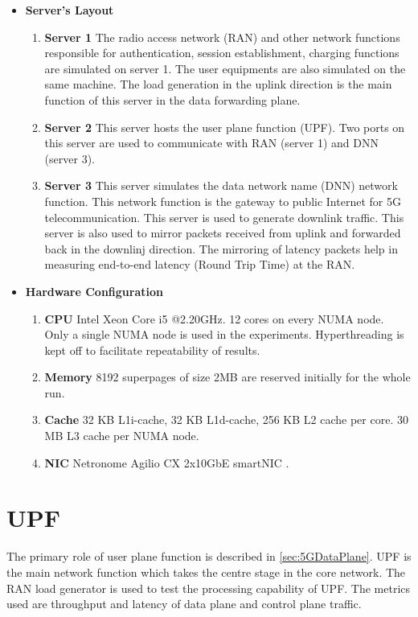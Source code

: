  \begin{itemize} 
        \item \textbf{Server's Layout}
        \begin{enumerate}
                \item \textbf{Server 1} The radio access network (RAN) and other network functions responsible for authentication,
         session establishment, charging functions are simulated on server 1.  The user equipments are also 
         simulated on the same machine. The load generation in the uplink direction is the main function of this server in the data forwarding plane.
                \item \textbf{Server 2} This server hosts the user plane function
		 (UPF). Two ports on this server are used to communicate with RAN 
         (server 1) and DNN (server 3).
                 \item \textbf{Server 3} This server simulates the data network name (DNN) network function. This network 
        function is the gateway to public Internet for 5G telecommunication. This server is used to generate downlink traffic. This server is also used to mirror packets received from uplink and forwarded back in the downlinj direction. The mirroring of latency packets help in measuring end-to-end latency (Round Trip Time) at the RAN. 
        \end{enumerate} 
        \item \textbf{Hardware Configuration} 
        \begin{enumerate}
                \item \textbf{CPU} Intel Xeon Core i5 @2.20GHz. 12 cores on every NUMA node. Only a single NUMA node is used in the experiments. Hyperthreading is kept off to facilitate repeatability of results.
                \item \textbf{Memory} 8192 superpages of size 2MB are reserved initially for the whole run.
                \item \textbf{Cache} 32 KB L1i-cache, 32 KB L1d-cache, 256 KB L2 cache per core. 30 MB L3 cache per NUMA node. 
                \item \textbf{NIC} Netronome Agilio CX 2x10GbE smartNIC \cite{netronome}.
	       \end{enumerate}
        
\end{itemize}

\section{UPF}
The primary role of user plane function is described in \ref{sec:5GDataPlane}. UPF is the main network function which takes the centre stage in the core network. The RAN load generator is used to test the processing capability of UPF. The metrics used are throughput and latency of data plane and control plane traffic. 

